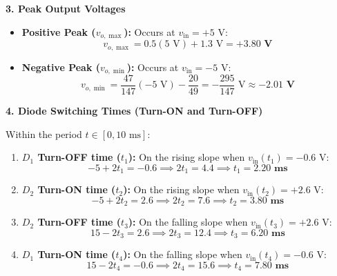 \vspace{0.4cm}
\noindent\textbf{3. Peak Output Voltages}\par\smallskip
\begin{itemize}
    \item \textbf{Positive Peak ($v_{o,\max}$):} Occurs at $v_{\text{in}} = +5\text{ V}$:
    \begin{equation}
        v_{o,\max} = 0.5(5\text{ V}) + 1.3\text{ V} = \mathbf{+3.80\text{ V}}
    \end{equation}
    \item \textbf{Negative Peak ($v_{o,\min}$):} Occurs at $v_{\text{in}} = -5\text{ V}$:
    \begin{equation}
        v_{o,\min} = \frac{47}{147}(-5\text{ V}) - \frac{20}{49} = -\frac{295}{147}\text{ V} \approx \mathbf{-2.01\text{ V}}
    \end{equation}
\end{itemize}

\vspace{0.3cm}
\noindent\textbf{4. Diode Switching Times (Turn-ON and Turn-OFF)}\par\smallskip
Within the period $t \in [0, 10\text{ ms}]$:
\begin{enumerate}
    \item \textbf{$D_1$ Turn-OFF time ($t_1$):} On the rising slope when $v_{\text{in}}(t_1) = -0.6\text{ V}$:
    \begin{equation}
        -5 + 2t_1 = -0.6 \implies 2t_1 = 4.4 \implies t_1 = \mathbf{2.20\text{ ms}}
    \end{equation}

    \item \textbf{$D_2$ Turn-ON time ($t_2$):} On the rising slope when $v_{\text{in}}(t_2) = +2.6\text{ V}$:
    \begin{equation}
        -5 + 2t_2 = 2.6 \implies 2t_2 = 7.6 \implies t_2 = \mathbf{3.80\text{ ms}}
    \end{equation}

    \item \textbf{$D_2$ Turn-OFF time ($t_3$):} On the falling slope when $v_{\text{in}}(t_3) = +2.6\text{ V}$:
    \begin{equation}
        15 - 2t_3 = 2.6 \implies 2t_3 = 12.4 \implies t_3 = \mathbf{6.20\text{ ms}}
    \end{equation}

    \item \textbf{$D_1$ Turn-ON time ($t_4$):} On the falling slope when $v_{\text{in}}(t_4) = -0.6\text{ V}$:
    \begin{equation}
        15 - 2t_4 = -0.6 \implies 2t_4 = 15.6 \implies t_4 = \mathbf{7.80\text{ ms}}
    \end{equation}
\end{enumerate}

